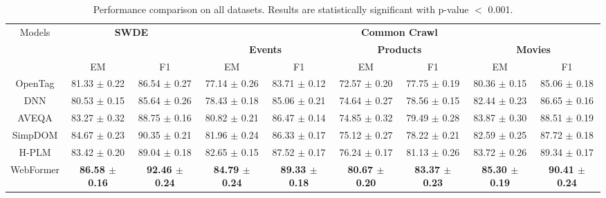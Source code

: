 \documentclass[sigconf]{acmart}
\begin{document}
\begin{table*}
\begin{adjustbox}{width=1.9\columnwidth,center}
\begin{tabular}{c|cc|cc|cc|cc}
\hline
\multirow{3}{*}{Models} &	\multicolumn{2}{c|}{\multirow{2}{*}{\bf SWDE}} & \multicolumn{6}{c}{\bf Common Crawl} \\
\cline{4-9}
& &	&\multicolumn{2}{c|}{\bf Events} &\multicolumn{2}{c|}{\bf Products}&\multicolumn{2}{c}{\bf Movies}\\
\cline{2-9}
& EM & F1 &EM & F1 & EM & F1 & EM & F1 \\
\hline
OpenTag & 81.33 $\pm$ 0.22 & 86.54 $\pm$ 0.27 & 77.14 $\pm$ 0.26 & 83.71 $\pm$ 0.12& 72.57 $\pm$ 0.20 & 77.75 $\pm$ 0.19 & 80.36 $\pm$ 0.15 & 85.06 $\pm$ 0.18 \\
DNN & 80.53 $\pm$ 0.15 & 85.64 $\pm$ 0.26 & 78.43 $\pm$ 0.18 & 85.06 $\pm$ 0.21& 74.64 $\pm$ 0.27 & 78.56 $\pm$ 0.15 & 82.44 $\pm$ 0.23 & 86.65 $\pm$ 0.16 \\
AVEQA & 83.27 $\pm$ 0.32 & 88.75 $\pm$ 0.16 & 80.82 $\pm$ 0.21 & 86.47 $\pm$ 0.14& 74.85 $\pm$ 0.32 & 79.49 $\pm$ 0.28 & 83.87 $\pm$ 0.30 & 88.51 $\pm$ 0.19 \\
SimpDOM & 84.67 $\pm$ 0.23 & 90.35 $\pm$ 0.21 & 81.96 $\pm$ 0.24 & 86.33 $\pm$ 0.17& 75.12 $\pm$ 0.27 & 78.22 $\pm$ 0.21 & 82.59 $\pm$ 0.25 & 87.72 $\pm$ 0.18 \\
H-PLM & 83.42 $\pm$ 0.20 & 89.04 $\pm$ 0.18 & 82.65 $\pm$ 0.15 & 87.52 $\pm$ 0.17& 76.24 $\pm$ 0.17 & 81.13 $\pm$ 0.26 & 83.72 $\pm$ 0.26 & 89.34 $\pm$ 0.17 \\
\hline
WebFormer & {\bf 86.58 $\pm$ 0.16} & {\bf 92.46 $\pm$ 0.24} & {\bf 84.79 $\pm$ 0.24} & {\bf 89.33 $\pm$ 0.18}& {\bf 80.67 $\pm$ 0.20} & {\bf 83.37 $\pm$ 0.23} & {\bf 85.30 $\pm$ 0.19} & {\bf 90.41 $\pm$ 0.24} \\
\hline
\end{tabular}
\end{adjustbox}
\caption{Performance comparison on all datasets. Results are statistically significant with p-value $<$ 0.001.}\label{table:performance}
\end{table*}
\end{document}
